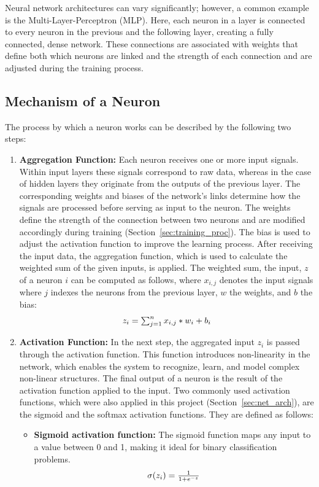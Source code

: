 \documentclass[12pt,fleqn,a4paper]{article}
\begin{document}
Neural network architectures can vary significantly; however, a common example is the Multi-Layer-Perceptron (MLP). Here, each neuron in a layer is connected to every neuron in the previous and the following layer, creating a fully connected, dense network. These connections are associated with weights that define both which neurons are linked and the strength of each connection and are adjusted during the training process.


\subsection{Mechanism of a Neuron}
The process by which a neuron works can be described by the following two steps:
 \begin{enumerate}
 \item \textbf{Aggregation Function:} Each neuron receives one or more input signals. Within input layers these signals correspond to raw data, whereas in the case of hidden layers they originate from the outputs of the previous layer. The corresponding weights and biases of the network's links determine how the signals are processed before serving as input to the neuron. The weights define the strength of the connection between two neurons and are modified accordingly during training (Section~\ref{sec:training_proc}). The bias is used to adjust the activation function to improve the learning process. 
After receiving the input data, the aggregation function, which is used to calculate the weighted sum of the given inputs, is applied. The weighted sum, the input, $z$ of a neuron $i$ can be computed as follows, where $x_{i,j}$ denotes the input signals where $j$ indexes the neurons from the previous layer, $w$ the weights, and $b$ the bias: 
\begin{equation}
$$z_i = \sum_{j=1}^n x_{i,j}* w_i +b_i$$
\label{eq:weighted_sum}
\end{equation}

 \item \textbf{Activation Function:} In the next step, the aggregated input $z_i$ is passed through the activation function. This function introduces non-linearity in the network, which enables the system to recognize, learn, and model complex non-linear structures. The final output of a neuron is the result of the activation function applied to the input. Two commonly used activation functions, which were also applied in this project (Section~\ref{sec:net_arch}), are the sigmoid and the softmax activation functions. They are defined as follows:
\begin{itemize}
\item \textbf{Sigmoid activation function:} The sigmoid function maps any input to a value between 0 and 1, making it ideal for binary classification problems. 
\begin{equation}
$$\sigma(z_i)=\frac{1}{1+e^{-z}}$$
\label{eq:sigmoid_act}
\end{equation}


\end{itemize}
\end{enumerate}
\end{document}
